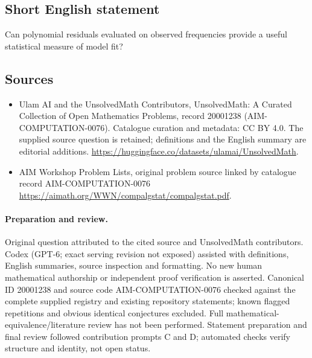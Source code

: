 \documentclass[11pt]{article}
\begin{document}
\subsection{Short English statement}
Can polynomial residuals evaluated on observed frequencies provide a useful statistical measure of model fit?
\subsection{Sources}
\begin{itemize}
\item[\hypertarget{source:20001238:1}{S1}] Ulam AI and the UnsolvedMath Contributors, UnsolvedMath: A Curated Collection of Open Mathematics Problems, record 20001238 (AIM-COMPUTATION-0076). Catalogue curation and metadata: CC BY 4.0. The supplied source question is retained; definitions and the English summary are editorial additions.
\url{https://huggingface.co/datasets/ulamai/UnsolvedMath}.
\item[\hypertarget{source:20001238:2}{S2}] AIM Workshop Problem Lists, original problem source linked by catalogue record AIM-COMPUTATION-0076
\url{https://aimath.org/WWN/compalgstat/compalgstat.pdf}.
\end{itemize}
\paragraph{Preparation and review.}
Original question attributed to the cited source and UnsolvedMath contributors. Codex (GPT-6; exact serving revision not exposed) assisted with definitions, English summaries, source inspection and formatting. No new human mathematical authorship or independent proof verification is asserted. Canonical ID 20001238 and source code AIM-COMPUTATION-0076 checked against the complete supplied registry and existing repository statements; known flagged repetitions and obvious identical conjectures excluded. Full mathematical-equivalence/literature review has not been performed. Statement preparation and final review followed contribution prompts C and D; automated checks verify structure and identity, not open status.
\label{end:20001238}
\end{document}
